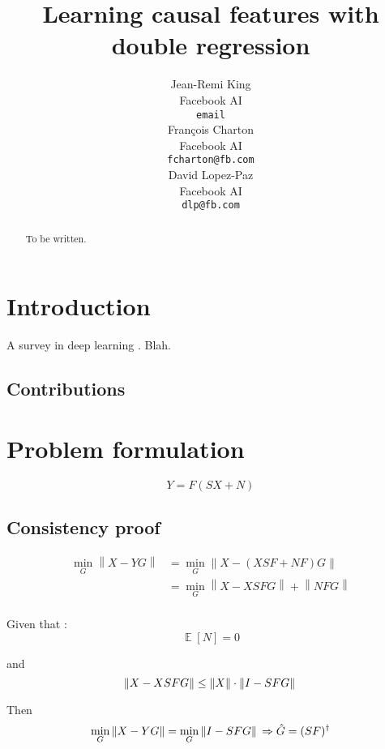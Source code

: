\documentclass{article}
\title{Learning causal features with double regression}
\author{%
  Jean-Remi King\\
  Facebook AI\\
  \texttt{email} \\
  \And
  Fran\c{c}ois Charton\\
  Facebook AI\\
  \texttt{fcharton@fb.com}\\
  \And
  David Lopez-Paz\\
  Facebook AI\\
  \texttt{dlp@fb.com}
}
\begin{document}
\maketitle

\begin{abstract}
    To be written.
\end{abstract}

\section{Introduction}


A survey in deep learning \citep{deep_learning_nature}. Blah.

\subsection{Contributions}

\section{Problem formulation}
\begin{equation}
    Y = F(SX + N)
    \label{eq:model}
\end{equation}

\subsection{Consistency proof}

\begin{equation}
\begin{aligned}
\min_G \left \| X-YG \right \| &= \min_G \left \| X - (XSF+NF)G\right\| \\
&{}= \min_G \left \| X - XSFG\right\|  + \left \| NFG \right \| \\
\end{aligned}
\end{equation}

Given that :
\begin{equation}
\mathop{\mathbb{E}}[N]=0
\end{equation}

and
\begin{equation}
\left \| X-XSFG \right \| \leq \left \| X \right \| \cdot  \left \| I-SFG \right \| \\
\end{equation}

Then
\begin{equation}
\min_G \left \| X-YG \right \| = \min_G \left \| I -SFG\right\| \\
\Rightarrow \hat  G= (SF)^{\dagger}
\end{equation}
\end{document}
